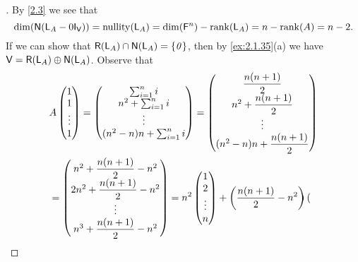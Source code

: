 \begin{proof}[]
  By \cref{2.3} we see that
  \[
    \dim(\ns{\L_A - 0 \IT[\V]}) = \nt{\L_A} = \dim(\vs{F}^n) - \rk{\L_A} = n - \rk{A} = n - 2.
  \]
  If we can show that \(\rg{\L_A} \cap \ns{\L_A} = \set{\zv}\), then by \cref{ex:2.1.35}(a) we have \(\V = \rg{\L_A} \oplus \ns{\L_A}\).
  Observe that
  \begin{align*}
     & A \begin{pmatrix}
           1      \\
           1      \\
           \vdots \\
           1
         \end{pmatrix} = \begin{pmatrix}
                           \sum_{i = 1}^n i       \\
                           n^2 + \sum_{i = 1}^n i \\
                           \vdots                 \\
                           (n^2 - n) n + \sum_{i = 1}^n i
                         \end{pmatrix} = \begin{pmatrix}
                                           \dfrac{n(n + 1)}{2}       \\
                                           n^2 + \dfrac{n(n + 1)}{2} \\
                                           \vdots                    \\
                                           (n^2 - n) n + \dfrac{n(n + 1)}{2}
                                         \end{pmatrix}                  \\
     & = \begin{pmatrix}
           n^2 + \dfrac{n(n + 1)}{2} - n^2  \\
           2n^2 + \dfrac{n(n + 1)}{2} - n^2 \\
           \vdots                           \\
           n^3 + \dfrac{n(n + 1)}{2} - n^2
         \end{pmatrix} = n^2 \begin{pmatrix}
                               1      \\
                               2      \\
                               \vdots \\
                               n
                             \end{pmatrix} + \left\lparen\dfrac{n(n + 1)}{2} - n^2\right\rparen \begin{pmatrix}

\end{pmatrix}
\end{align*}
\end{proof}
